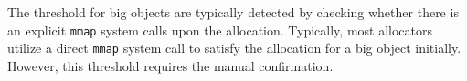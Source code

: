 The threshold for big objects are typically detected by checking whether there is an explicit \texttt{mmap} system calls upon the allocation. Typically, most allocators utilize a direct \texttt{mmap} system call to satisfy the allocation for a big object initially. However, this threshold requires the manual confirmation. 

